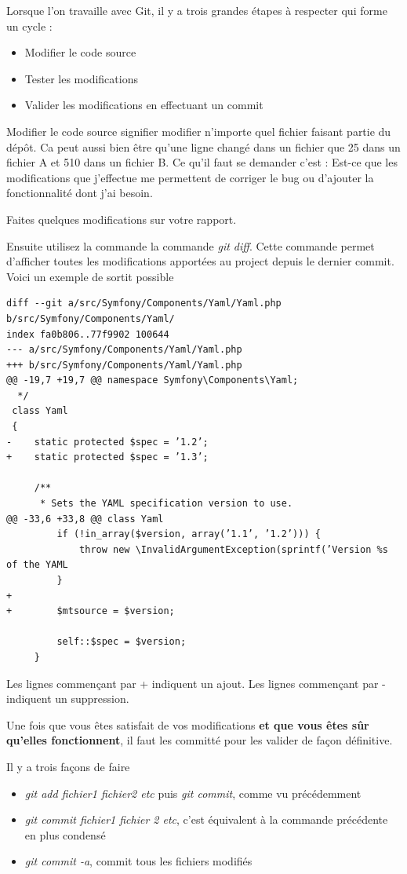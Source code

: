 \documentclass[a4paper]{article}
\begin{document}
Lorsque l'on travaille avec Git, il y a trois grandes étapes à respecter qui forme un cycle : 
\begin{itemize}
\item Modifier le code source
\item Tester les modifications
\item Valider les modifications en effectuant un commit
\end{itemize}

Modifier le code source signifier modifier n'importe quel fichier faisant partie du dép\^ot. Ca peut aussi bien être qu'une ligne changé dans un fichier que 25 dans un fichier A et 510 dans un fichier B. Ce qu'il faut se demander c'est : Est-ce que les modifications que j'effectue me permettent de corriger le bug ou d'ajouter la fonctionnalité dont j'ai besoin.

Faites quelques modifications sur votre rapport.

Ensuite utilisez la commande la commande \textit{git diff}. Cette commande permet d'afficher toutes les modifications apportées au project depuis le dernier commit. Voici un exemple de sortit possible

\begin{verbatim}
diff --git a/src/Symfony/Components/Yaml/Yaml.php b/src/Symfony/Components/Yaml/
index fa0b806..77f9902 100644
--- a/src/Symfony/Components/Yaml/Yaml.php
+++ b/src/Symfony/Components/Yaml/Yaml.php
@@ -19,7 +19,7 @@ namespace Symfony\Components\Yaml;
  */
 class Yaml
 {
-    static protected $spec = ’1.2’;
+    static protected $spec = ’1.3’;

     /**
      * Sets the YAML specification version to use.
@@ -33,6 +33,8 @@ class Yaml
         if (!in_array($version, array(’1.1’, ’1.2’))) {
             throw new \InvalidArgumentException(sprintf(’Version %s of the YAML
         }
+
+        $mtsource = $version;

         self::$spec = $version;
     }
\end{verbatim}

Les lignes commençant par + indiquent un ajout. Les lignes commençant par - indiquent un suppression.

Une fois que vous êtes satisfait de vos modifications \textbf{et que vous êtes sûr qu'elles fonctionnent}, il faut les committé pour les valider de façon définitive.

Il y a trois façons de faire

\begin{itemize}
\item \emph{git add fichier1 fichier2 etc} puis \emph{git commit}, comme vu précédemment 
\item \emph{git commit fichier1 fichier 2 etc}, c'est équivalent à la commande précédente en plus condensé
\item \emph{git commit -a}, commit tous les fichiers modifiés
\end{itemize}
\end{document}
